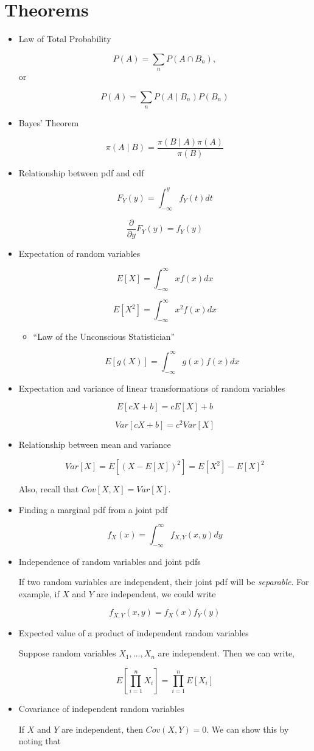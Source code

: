 \documentclass[
  letterpaper,
  DIV=11,
  numbers=noendperiod]{scrreprt}
\begin{document}
\hypertarget{theorems}{%
\section{Theorems}\label{theorems}}

\begin{itemize}
\item
  Law of Total Probability

  \[
  P(A) = \sum_n P(A \cap B_n),
  \]or

  \[
  P(A) = \sum_n P(A \mid B_n) P(B_n)
  \]
\item
  Bayes' Theorem

  \[
  \pi(A \mid B) = \frac{\pi(B \mid A) \pi(A)}{\pi(B)}
  \]
\item
  Relationship between pdf and cdf

  \[
  F_Y(y) = \int_{-\infty}^y f_Y(t)dt
  \]

  \[
  \frac{\partial}{\partial y}F_Y(y) = f_Y(y)
  \]
\item
  Expectation of random variables

  \[
  E[X] = \int_{-\infty}^\infty x f(x) dx
  \]

  \[
  E[X^2] = \int_{-\infty}^\infty x^2 f(x) dx
  \]

  \begin{itemize}
  \item
    ``Law of the Unconscious Statistician''

    \[
    E[g(X)] = \int_{-\infty}^\infty g(x)f(x)dx
    \]
  \end{itemize}
\item
  Expectation and variance of linear transformations of random variables

  \[
  E[cX + b] = c E[X] + b
  \]

  \[
  Var[cX + b] = c^2 Var[X]
  \]
\item
  Relationship between mean and variance

  \[
  Var[X] = E[(X - E[X])^2] = E[X^2] - E[X]^2
  \]

  Also, recall that \(Cov[X, X] = Var[X]\).
\item
  Finding a marginal pdf from a joint pdf

  \[
  f_X(x) = \int_{-\infty}^\infty f_{X,Y}(x, y) dy
  \]
\item
  Independence of random variables and joint pdfs

  If two random variables are independent, their joint pdf will be
  \emph{separable}. For example, if \(X\) and \(Y\) are independent, we
  could write

  \[
  f_{X,Y}(x, y) = f_{X}(x)f_Y(y)
  \]
\item
  Expected value of a product of independent random variables

  Suppose random variables \(X_1, \dots, X_n\) are independent. Then we
  can write,

  \[
  E\left[\prod_{i = 1}^n X_i\right] = \prod_{i = 1}^n E[X_i]
  \]
\item
  Covariance of independent random variables

  If \(X\) and \(Y\) are independent, then \(Cov(X, Y) = 0\). We can
  show this by noting that
\end{itemize}
\end{document}
